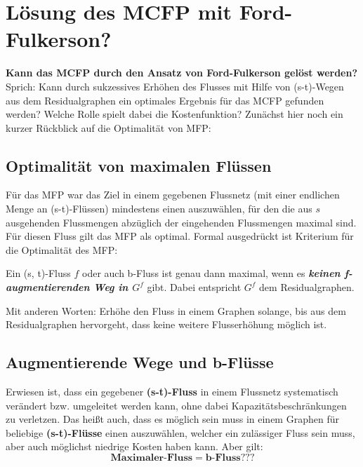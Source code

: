 \section{Lösung des MCFP mit Ford-Fulkerson?}

\textbf{Kann das MCFP durch den Ansatz von Ford-Fulkerson gelöst werden?} Sprich:
Kann durch sukzessives Erhöhen des Flusses mit Hilfe von (s-t)-Wegen aus dem Residualgraphen ein optimales Ergebnis für das MCFP gefunden werden? Welche Rolle spielt dabei die Kostenfunktion? Zunächst hier noch ein kurzer Rückblick auf die Optimalität von MFP:

\subsection{Optimalität von maximalen Flüssen}

Für das MFP war das Ziel in einem gegebenen Flussnetz (mit einer endlichen Menge an (s-t)-Flüssen) mindestens einen auszuwählen, für den die aus $s$ ausgehenden Flussmengen abzüglich der eingehenden Flussmengen maximal sind. Für diesen Fluss gilt das MFP als optimal. Formal ausgedrückt ist Kriterium für die Optimalität des MFP:
\begin{definition}[Satz 10.5]
    Ein (s, t)-Fluss $f$ oder auch b-Fluss ist genau dann maximal, wenn es \textbf{\textit{keinen f-augmentierenden Weg in $G^f$}} gibt. Dabei entspricht $G^f$ dem Residualgraphen.
\end{definition}
Mit anderen Worten: Erhöhe den Fluss in einem Graphen solange, bis aus dem Residualgraphen hervorgeht, dass keine weitere Flusserhöhung möglich ist.

\subsection{Augmentierende Wege und b-Flüsse}

Erwiesen ist, dass ein gegebener \textbf{(s-t)-Fluss} in einem Flussnetz systematisch verändert bzw. umgeleitet werden kann, ohne dabei Kapazitätsbeschränkungen zu verletzen. Das heißt auch, dass es möglich sein muss in einem Graphen für beliebige \textbf{(s-t)-Flüsse} einen auszuwählen, welcher ein zulässiger Fluss sein muss, aber auch möglichst niedrige Kosten haben kann. Aber gilt:
\begin{equation}
    \textbf{Maximaler-Fluss} = \textbf{b-Fluss} ???
\label{formular:st_flow_eq_b_flow}
\end{equation}

